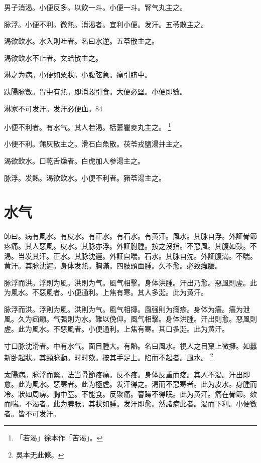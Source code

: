 男子消渴。小便反多。以飲一斗。小便一斗。腎气丸主之。

脉浮。小便不利。微熱。消渴者。宜利小便。发汗。五苓散主之。

渴欲飲水。水入則吐者。名曰水逆。五苓散主之。

渴欲飲水不止者。文蛤散主之。

淋之为病。小便如粟狀。小腹弦急。痛引脐中。

趺陽脉數。胃中有熱。即消穀引食。大便必堅。小便即數。

淋家不可发汗。发汗必便血。84

小便不利者。有水气。其人若渴。栝蔞瞿麥丸主之。
	\footnote{
		「若渴」徐本作「苦渴」。
	}

小便不利。蒲灰散主之。滑石白魚散。茯苓戎鹽湯并主之。

渴欲飲水。口乾舌燥者。白虎加人参湯主之。

脉浮。发熱。渴欲飲水。小便不利者。豬苓湯主之。

\chapter{水气}

師曰。病有風水。有皮水。有正水。有石水。有黄汗。風水。其脉自浮。外証骨節疼痛。{\khaaitp 其人}惡風。皮水。其脉亦浮。外証胕腫。按之沒指。不惡風。其腹如鼓。不渴。当发其汗。正水。其脉沈遲。外証自喘。石水。其脉自沈。外証腹滿。不喘。黄汗。其脉沈遲。身{\khaaitp 体}发熱。胸滿。四肢頭面腫。久不愈。必致癰膿。

脉浮而洪。浮則为風。洪則为气。風气相擊。身体洪腫。汗出乃愈。惡風則虗。此为風水。不惡風者。小便通利。上焦有寒。其人多涎。此为黄汗。{\wuben}

脉浮而洪。浮則为風。洪則为气。風气相摶。風强則为癮疹。身体为癢。癢为泄風。久为痂癩。气强則为水。難以俛仰。風气相擊。身体洪腫。汗出則愈。惡風則虗。此为風水。不惡風者。小便通利。上焦有寒。其口多涎。此为黄汗。{\dengben}


寸口脉沈滑者。中有水气。面目腫大。有熱。名曰風水。視人之目窠上微擁。如{\khaaitp 蠶}新卧起狀。其頸脉動。时时欬。按其手足上。陷而不起者。風水。
	\footnote{
		吳本无此條。
	}

太陽病。脉浮而緊。法当骨節疼痛。反不疼。身体反重而痠。其人不渴。汗出即愈。此为風水。惡寒者。此为極虗。发汗得之。渴而不惡寒者。此为皮水。身腫而冷。狀如周痹。胸中窒。不能食。反聚痛。暮躁不{\khaaitp 得}眠。此为黄汗。痛在骨節。欬而喘。不渴者。此为脾胀。其狀如腫。发汗即愈。然諸病此者。渴而下利。小便數者。皆不可发汗。

